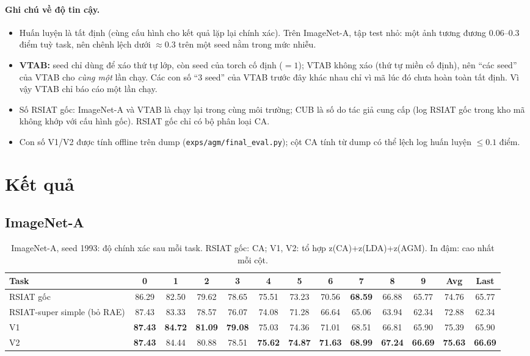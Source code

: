 \documentclass[11pt]{article}
\begin{document}
\paragraph{Ghi chú về độ tin cậy.}
\begin{itemize}
\item Huấn luyện là tất định (cùng cấu hình cho kết quả lặp lại chính xác). Trên ImageNet-A, tập test nhỏ: một ảnh
tương đương $0.06$--$0.3$ điểm tuỳ task, nên chênh lệch dưới $\approx0.3$ trên một seed nằm trong mức nhiễu.
\item \textbf{VTAB:} seed chỉ dùng để xáo thứ tự lớp, còn seed của torch cố định ($=1$); VTAB không xáo (thứ tự miền
cố định), nên ``các seed'' của VTAB cho \emph{cùng một} lần chạy. Các con số ``3 seed'' của VTAB trước đây khác nhau
chỉ vì mã lúc đó chưa hoàn toàn tất định. Vì vậy VTAB chỉ báo cáo một lần chạy.
\item Số RSIAT gốc: ImageNet-A và VTAB là chạy lại trong cùng môi trường; CUB là số do tác giả cung cấp (log RSIAT gốc
trong kho mã không khớp với cấu hình gốc). RSIAT gốc chỉ có bộ phân loại CA.
\item Con số V1/V2 được tính offline trên dump (\texttt{exps/agm/final\_eval.py}); cột CA tính từ dump có thể lệch log
huấn luyện $\le0.1$ điểm.
\end{itemize}

\section{Kết quả}\label{sec:results}

\subsection{ImageNet-A}

\begin{table}[H]
\centering\small
\caption{ImageNet-A, seed 1993: độ chính xác sau mỗi task. RSIAT gốc: CA; V1, V2: tổ hợp z(CA)+z(LDA)+z(AGM).
In đậm: cao nhất mỗi cột.}
\label{tab:ina1993}
\setlength{\tabcolsep}{4pt}
\begin{tabular}{l*{10}{c}cc}
\toprule
Task & 0 & 1 & 2 & 3 & 4 & 5 & 6 & 7 & 8 & 9 & Avg & Last \\
\midrule
RSIAT gốc & 86.29 & 82.50 & 79.62 & 78.65 & 75.51 & 73.23 & 70.56 & \textbf{68.59} & 66.88 & 65.77 & 74.76 & 65.77 \\
RSIAT-super simple (bỏ RAE) & 87.43 & 83.33 & 78.57 & 76.07 & 74.08 & 71.28 & 66.64 & 65.06 & 63.94 & 62.34 & 72.88 & 62.34 \\
V1 & \textbf{87.43} & \textbf{84.72} & \textbf{81.09} & \textbf{79.08} & 75.03 & 74.36 & 71.01 & 68.51 & 66.81 & 65.90 & 75.39 & 65.90 \\
V2 & \textbf{87.43} & 84.44 & 80.88 & 78.51 & \textbf{75.62} & \textbf{74.87} & \textbf{71.63} & \textbf{68.99} & \textbf{67.24} & \textbf{66.69} & \textbf{75.63} & \textbf{66.69} \\
\bottomrule
\end{tabular}
\end{table}
\end{document}
